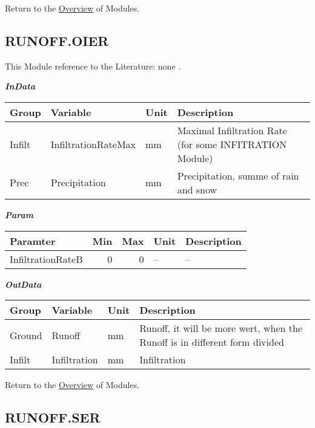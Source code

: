 \documentclass[
]{book}
\begin{document}
Return to the \protect\hyperlink{module}{Overview} of Modules.

\hypertarget{RUNOFF.OIER}{%
\subsection{RUNOFF.OIER}\label{RUNOFF.OIER}}

This Module reference to the Literature: none \citep{none}.

\textbf{\emph{InData}}

\begin{table}[!h]
\centering
\begin{tabular}{l|l|l|l}
\hline
Group & Variable & Unit & Description\\
\hline
Infilt & InfiltrationRateMax & mm & Maximal Infiltration Rate (for some INFITRATION Module)\\
\cline{1-4}
Prec & Precipitation & mm & Precipitation, summe of rain and snow\\
\hline
\end{tabular}
\end{table}

\textbf{\emph{Param}}

\begin{table}[!h]
\centering
\begin{tabular}{l|r|r|l|l}
\hline
Paramter & Min & Max & Unit & Description\\
\hline
InfiltrationRateB & 0 & 0 & -- & --\\
\hline
\end{tabular}
\end{table}

\textbf{\emph{OutData}}

\begin{table}[!h]
\centering
\begin{tabular}{l|l|l|l}
\hline
Group & Variable & Unit & Description\\
\hline
Ground & Runoff & mm & Runoff, it will be more wert, when the Runoff is in different form divided\\
\cline{1-4}
Infilt & Infiltration & mm & Infiltration\\
\hline
\end{tabular}
\end{table}

Return to the \protect\hyperlink{module}{Overview} of Modules.

\hypertarget{RUNOFF.SER}{%
\subsection{RUNOFF.SER}\label{RUNOFF.SER}}
\end{document}
